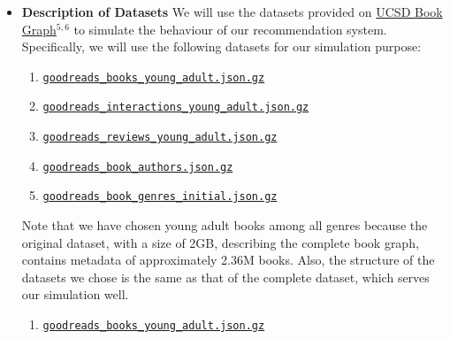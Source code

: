 \documentclass[fontsize=11pt]{article}
\begin{document}
\begin{itemize}
\item \textbf{Description of Datasets}
We will use the datasets provided on \href{https://sites.google.com/eng.ucsd.edu/ucsdbookgraph/home}{UCSD Book Graph}$^{5, 6}$ to simulate the behaviour of our recommendation system. Specifically, we will use the following datasets for our simulation purpose:
\begin{enumerate}
\item
\texttt{\href{https://drive.google.com/uc?id=1gH7dG4yQzZykTpbHYsrw2nFknjUm0Mol}{goodreads\_books\_young\_adult.json.gz}}
\item 
\texttt{\href{https://drive.google.com/uc?id=1NNX7SWcKahezLFNyiW88QFPAqOAYP5qg}{goodreads\_interactions\_young\_adult.json.gz}}
\item 
\texttt{\href{https://drive.google.com/uc?id=1M5iqCZ8a7rZRtsmY5KQ5rYnP9S0bQJVo}{goodreads\_reviews\_young\_adult.json.gz}}
\item 
\texttt{\href{https://drive.google.com/uc?id=19cdwyXwfXx_HDIgxXaHzH0mrx8nMyLvC}{goodreads\_book\_authors.json.gz}}
\item 
\texttt{\href{https://drive.google.com/uc?id=1ah0_KpUterVi-AHxJ03iKD6O0NfbK0md}{goodreads\_book\_genres\_initial.json.gz}}
\end{enumerate}
Note that we have chosen young adult books among all genres because the original dataset, with a size of 2GB, describing the complete book graph, contains metadata of approximately 2.36M books. Also, the structure of the datasets we chose is the same as that of the complete dataset, which serves our simulation well.
\begin{enumerate}
\item \texttt{\href{https://drive.google.com/uc?id=1gH7dG4yQzZykTpbHYsrw2nFknjUm0Mol}{goodreads\_books\_young\_adult.json.gz}}
 

\end{enumerate}
\end{itemize}
\end{document}
